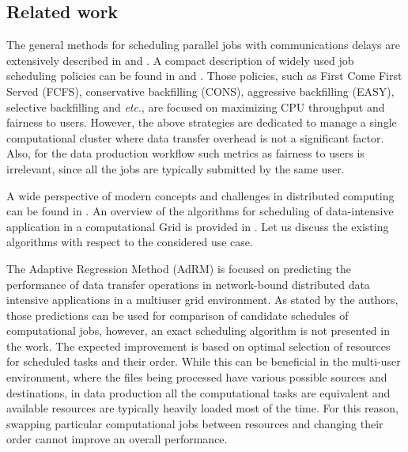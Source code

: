\documentclass{svjour3}                     %
\begin{document}
\subsection{Related work}
The general methods for scheduling parallel jobs with communications delays are extensively described in  \cite{bookDrozdovski} and \cite{sinnen2007task}. A compact description of widely used job scheduling policies can be found in \cite{Klusacek} and \cite{srinivasan2002selective}. Those policies, such as First Come First Served (FCFS), conservative backfilling (CONS), aggressive backfilling (EASY), selective backfilling and \textit{etc}., are focused on maximizing CPU throughput and fairness to users.  However, the above strategies are dedicated to manage a single computational cluster where data transfer overhead is not a significant factor. Also, for the data production workflow such metrics as fairness to users is irrelevant, since all the jobs are typically submitted by the same user.

A wide perspective of modern concepts and challenges in distributed computing can be found in \cite{hwang2013distributed}. An overview of the algorithms for scheduling of data-intensive application in a computational Grid is provided in \cite{Magoules}.  %
Let us discuss the existing algorithms with respect to the considered use case.

%

The Adaptive Regression Method (AdRM) \cite{AdRM} is focused on predicting the performance of data transfer operations in network-bound distributed data intensive applications in a multiuser grid environment. As stated by the authors, those predictions can be used for comparison of candidate schedules of computational jobs, however, an exact scheduling algorithm is not presented in the work. The expected improvement is based on optimal selection of resources for scheduled tasks and their order. While this can be beneficial in the multi-user environment, where the files being processed have various possible sources and destinations, in data production all the computational tasks are equivalent  and  available resources are typically heavily loaded most of the time. For this reason, swapping particular computational jobs between resources and changing their order cannot improve an overall performance.
\end{document}
